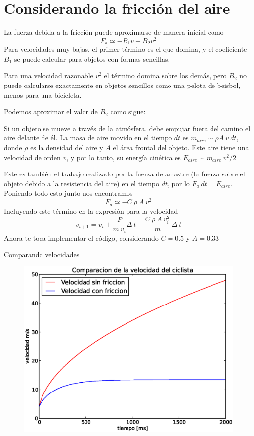 \documentclass[12pt]{article}
\begin{document}
\section*{Considerando la fricción del aire}
La fuerza debida a la fricción puede aproximarse de manera inicial como
\begin{equation}\label{EqFfriccion}
F_{a} \simeq - B_{1} v - B_{2} v^{2}
\end{equation}
Para velocidades muy bajas, el primer término es el que domina, y el coeficiente $B_{1}$ se puede calcular para objetos con formas sencillas.
\par
Para una velocidad razonable $v^{2}$ el término domina sobre los demás, pero $B_{2}$ no puede calcularse exactamente en objetos sencillos como una pelota de beisbol, menos para una bicicleta.
\par
Podemos aproximar el valor de $B_{2}$ como sigue:
\par
Si un objeto se mueve a través de la atmósfera, debe empujar fuera del camino el aire delante de él. La masa de aire movido en el tiempo $dt$ es $m_{aire} \sim \rho A \: v \: dt$, donde $\rho$ es la densidad del aire y $A$ el área frontal del objeto. Este aire tiene una velocidad de orden $v$, y por lo tanto, su energía cinética es $E_{aire} \sim m_{aire} \: v^{2} /2$
\par
Este es también el trabajo realizado por la fuerza de arrastre (la fuerza sobre el objeto debido a la resistencia del aire) en el tiempo $dt$, por lo $F_{a} \: dt = E_{aire}$. Poniendo todo esto junto nos encontramos
\[ F_{a} \simeq - C \: \rho \: A \: v^{2} \]
Incluyendo este término en la expresión para la velocidad
\begin{equation}\label{Eqvelifriccion}
v_{i+1} = v_{i} + \dfrac{P}{m \: v_{i}} \Delta \: t - \dfrac{C \: \rho \: A \: v_{i}^{2}}{m} \: \Delta \: t
\end{equation}
Ahora te toca implementar el código, considerando $C = 0.5$ y $A=0.33$
\par
Comparando velocidades
\begin{figure}[H]
	\centering
	\includegraphics[scale=0.5]{EjerBicicleta02.eps}
\end{figure}
\end{document}
